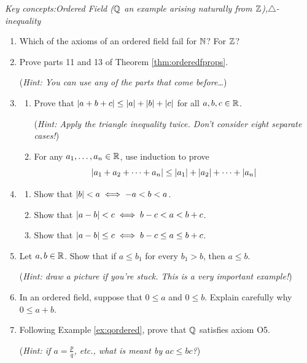 \begin{exercises}{}{}
	\emph{Key concepts:\quad Ordered Field ($\mathbb{Q}$ an example arising naturally from $\mathbb{Z}$),\quad $\triangle$-inequality}
	
	\begin{enumerate}
	  \item%
	  Which of the axioms of an ordered field fail for $\mathbb{N}$? For $\mathbb{Z}$?
	  
	  \item%
	  Prove parts 11 and 13 of Theorem \ref{thm:orderedfprops}.\par
	  (\emph{Hint: You can use any of the parts that come before\ldots})
	
	
	  \item%
	  \begin{enumerate}
	  	\item Prove that $\left| a+b+c\right|\le \left| a\right|+\left| b\right|+\left| c\right|$ for all $a,b,c\in\mathbb{R}$.\par
	  	(\emph{Hint: Apply the triangle inequality twice. Don't consider eight separate cases!})
	  	\item For any $a_1,\ldots,a_n\in\mathbb{R}$, use induction to prove
	  	\[
	  		\left| a_1+a_2+\cdots+a_n\right|\le\left| a_1\right|+\left| a_2\right|+\cdots+\left| a_n\right|
	  	\]
	  \end{enumerate}
	
	
	  \item%
	  \begin{enumerate}
	  	\item Show that $\left| b\right|<a\iff -a<b<a$.
	  	\item Show that $\left| a-b\right|<c\iff b-c<a<b+c$.
	  	\item Show that $\left| a-b\right|\le c\iff b-c\le a\le b+c$.
	  \end{enumerate}
	
	
	  \item%
	  Let $a,b\in\mathbb{R}$. Show that if $a\le b_1$ for every $b_1>b$, then $a\le b$.\par
	  (\emph{Hint: draw a picture if you're stuck. This is a very important example!})
	  
	  
	  \item In an ordered field, suppose that $0\le a$ and $0\le b$. Explain carefully why $0\le a+b$.
	  
	  
	  \item Following Example \ref{ex:qordered}, prove that $\mathbb{Q}$ satisfies axiom O5.\par
	  (\emph{Hint: if $a=\frac pq$, etc., what is meant by $ac\le bc$?}) 
	  

\end{enumerate}
\end{exercises}
